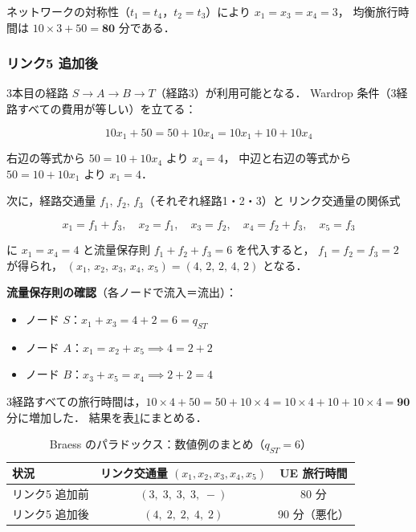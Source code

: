 ネットワークの対称性（$t_1 = t_4$，$t_2 = t_3$）により $x_1 = x_3 = x_4 = 3$，
均衡旅行時間は $10 \times 3 + 50 = \mathbf{80}$ 分である．

\subsubsection*{リンク5 追加後}

3本目の経路 $S \to A \to B \to T$（経路3）が利用可能となる．
Wardrop 条件（3経路すべての費用が等しい）を立てる：

\begin{equation}
  10 x_1 + 50
  = 50 + 10 x_4
  = 10 x_1 + 10 + 10 x_4
  \label{eq:braess-after-ue}
\end{equation}

右辺の等式から $50 = 10 + 10 x_4$ より $x_4 = 4$，
中辺と右辺の等式から $50 = 10 + 10 x_1$ より $x_1 = 4$．

次に，経路交通量 $f_1,\,f_2,\,f_3$（それぞれ経路1・2・3）と
リンク交通量の関係式

\begin{equation}
  x_1 = f_1 + f_3, \quad
  x_2 = f_1, \quad
  x_3 = f_2, \quad
  x_4 = f_2 + f_3, \quad
  x_5 = f_3
  \label{eq:braess-link-flow}
\end{equation}

に $x_1 = x_4 = 4$ と流量保存則 $f_1 + f_2 + f_3 = 6$ を代入すると，
$f_1 = f_2 = f_3 = 2$ が得られ，
$(x_1,\, x_2,\, x_3,\, x_4,\, x_5) = (4,\, 2,\, 2,\, 4,\, 2)$ となる．

\textbf{流量保存則の確認}（各ノードで流入＝流出）：

\begin{itemize}
  \item ノード $S$：$x_1 + x_3 = 4+2 = 6 = q_{ST}$ \checkmark
  \item ノード $A$：$x_1 = x_2 + x_5 \implies 4 = 2+2$ \checkmark
  \item ノード $B$：$x_3 + x_5 = x_4 \implies 2+2 = 4$ \checkmark
\end{itemize}

3経路すべての旅行時間は，$10\times4+50 = 50+10\times4 = 10\times4+10+10\times4 = \mathbf{90}$ 分に増加した．
結果を表\ref{tab:braess-result}にまとめる．

\begin{table}[hbtp]
  \centering
  \caption{Braess のパラドックス：数値例のまとめ（$q_{ST}=6$）}
  \label{tab:braess-result}
  \begin{tabular}{lcc}
    \toprule
    状況 & リンク交通量 $(x_1,x_2,x_3,x_4,x_5)$ & UE 旅行時間 \\
    \midrule
    リンク5 追加前 & $(3,\;3,\;3,\;3,\;-)$ & 80 分 \\
    リンク5 追加後 & $(4,\;2,\;2,\;4,\;2)$ & 90 分（悪化） \\
    \bottomrule
  \end{tabular}
\end{table}

